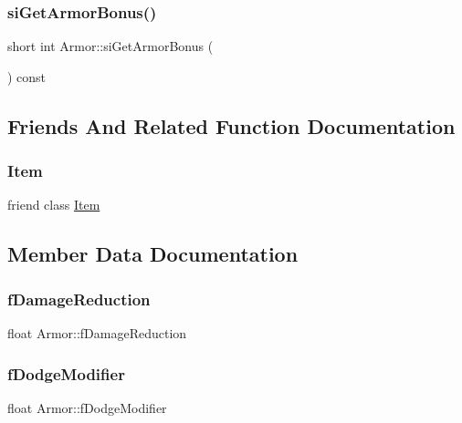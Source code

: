 \subsubsection{\texorpdfstring{si\+Get\+Armor\+Bonus()}{siGetArmorBonus()}}
{\footnotesize\ttfamily short int Armor\+::si\+Get\+Armor\+Bonus (\begin{DoxyParamCaption}{ }\end{DoxyParamCaption}) const}



\subsection{Friends And Related Function Documentation}
\mbox{\label{class_armor_aad85754f188b769ff61150eaf36106c4}} 
\subsubsection{\texorpdfstring{Item}{Item}}
{\footnotesize\ttfamily friend class \mbox{\hyperlink{class_item}{Item}}\hspace{0.3cm}{\ttfamily [friend]}}



\subsection{Member Data Documentation}
\mbox{\label{class_armor_acc29c5818b294aaaa11d8d1621b7dd19}} 
\subsubsection{\texorpdfstring{f\+Damage\+Reduction}{fDamageReduction}}
{\footnotesize\ttfamily float Armor\+::f\+Damage\+Reduction\hspace{0.3cm}{\ttfamily [private]}}

\mbox{\label{class_armor_aed2f98ba9acefdb67ac75104c55ea266}} 
\subsubsection{\texorpdfstring{f\+Dodge\+Modifier}{fDodgeModifier}}
{\footnotesize\ttfamily float Armor\+::f\+Dodge\+Modifier\hspace{0.3cm}{\ttfamily [private]}}

